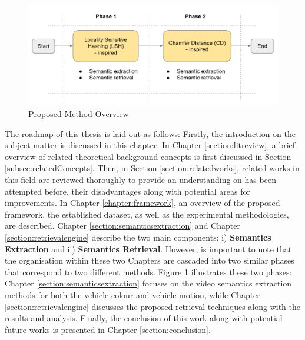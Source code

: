 \begin{figure}[!ht]\centering
\includegraphics[width=\textwidth]{image/general/phases.PNG}
\caption{Proposed Method Overview}
\label{fig:proposedmethodoverview}
\end{figure}

The roadmap of this thesis is laid out as follows: Firstly, the introduction on the subject matter is discussed in this chapter.
In Chapter \ref{section:litreview}, a brief overview of related theoretical background concepts is first discussed in Section \ref{subsec:relatedConcepts}. Then, in Section \ref{section:relatedworks}, related works in this field are reviewed thoroughly to provide an understanding on has been attempted before, their disadvantages along with potential areas for improvements.
In Chapter \ref{chapter:framework}, an overview of the proposed framework, the established dataset, as well as the experimental methodologies, are described.
Chapter \ref{section:semanticsextraction} and Chapter \ref{section:retrievalengine} describe the two main components: i) \textbf{Semantics Extraction} and ii) \textbf{Semantics Retrieval}. However, is important to note that the organisation within these two Chapters are cascaded into two similar phases that correspond to two different methods.
Figure \ref{fig:proposedmethodoverview} illustrates these two phases: Chapter \ref{section:semanticsextraction} focuses on the video semantics extraction methods for both the vehicle colour and vehicle motion, while Chapter \ref{section:retrievalengine} discusses the proposed retrieval techniques along with the results and analysis.
Finally, the conclusion of this work along with potential future works is presented in Chapter \ref{section:conclusion}.


